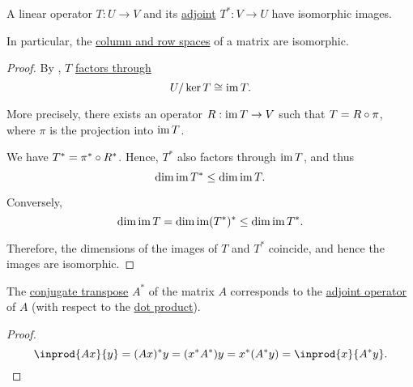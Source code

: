\begin{proposition}\label{thm:image_of_adjoint}
  A linear operator \( T: U \to V \) and its \hyperref[def:adjoint_operator]{adjoint} \( T^*: V \to U \) have isomorphic images.

  In particular, the \hyperref[def:column_and_row_spaces]{column and row spaces} of a matrix are isomorphic.
\end{proposition}
\begin{proof}
  By , \( T \) \hyperref[def:factors_through]{factors through}
  \begin{equation*}
    U / \ker T \cong \operatorname{im} T.
  \end{equation*}

  More precisely, there exists an operator \( R: \operatorname{im} T \to V \) such that \( T = R \bincirc \pi \), where \( \pi \) is the projection into \( \operatorname{im} T \).

  We have \( T^* = \pi^* \bincirc R^* \). Hence, \( T^* \) also factors through \( \operatorname{im} T \), and thus
  \begin{equation*}
    \dim \operatorname{im} T^* \leq \dim \operatorname{im} T.
  \end{equation*}

  Conversely,
  \begin{equation*}
    \dim \operatorname{im} T = \dim \operatorname{im} (T^*)^* \leq \dim \operatorname{im} T^*.
  \end{equation*}

  Therefore, the dimensions of the images of \( T \) and \( T^* \) coincide, and hence the images are isomorphic.
\end{proof}

\begin{proposition}\label{thm:conjugate_transpose}
  The \hyperref[def:conjugate_transpose]{conjugate transpose} \( A^* \) of the matrix \( A \) corresponds to the \hyperref[def:adjoint_operator]{adjoint operator} of \( A \) (with respect to the \hyperref[def:inner_product_space]{dot product}).
\end{proposition}
\begin{proof}
  \begin{equation*}
    \inprod {Ax} {y}
    =
    (Ax)^* y
    =
    (x^* A^*) y
    =
    x^* (A^* y)
    =
    \inprod {x} {A^* y}.
  \end{equation*}
\end{proof}

